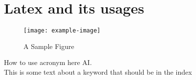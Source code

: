 \chapter{Latex and its usages}\label{Chapter_3}
\lipsum[1-4] %


\begin{figure}[ht]
  \centering
  \texttt{[image: example-image]}
  \caption{A Sample Figure}
  \label{fig:sample2}
\end{figure}

How to use acronym here \ac{AI}. \\


This is some text about a  keyword that should be in the index \cite{2002NCimB.117..687P}


\lipsum[1-5] %
